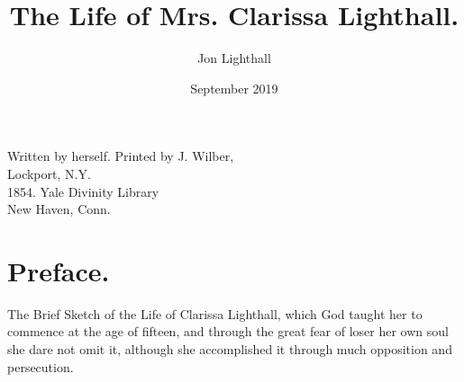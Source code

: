 \documentclass{article}
\title{The Life of Mrs. Clarissa Lighthall.}
\author{Jon Lighthall}
\date{September 2019}
\begin{document}
\maketitle
Written by herself.
Printed by J. Wilber,\\
Lockport, N.Y.\\
1854.
Yale Divinity Library\\
New Haven, Conn.
\section{Preface.}
The Brief Sketch of the Life of Clarissa Lighthall, which God taught her to commence at the age of fifteen, and through the great fear of loser her own soul she dare not omit it, although she accomplished it through much opposition and persecution.
\end{document}
